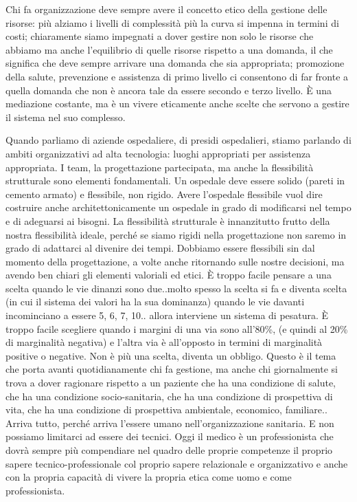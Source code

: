 \documentclass[]{article}
\begin{document}
Chi fa organizzazione deve sempre avere il concetto etico della gestione
delle risorse: più alziamo i livelli di complessità più la curva si
impenna in termini di costi; chiaramente siamo impegnati a dover gestire
non solo le risorse che abbiamo ma anche l'equilibrio di quelle risorse
rispetto a una domanda, il che significa che deve sempre arrivare una
domanda che sia appropriata; promozione della salute, prevenzione e
assistenza di primo livello ci consentono di far fronte a quella domanda
che non è ancora tale da essere secondo e terzo livello. È una
mediazione costante, ma è un vivere eticamente anche scelte che servono
a gestire il sistema nel suo complesso.

Quando parliamo di aziende ospedaliere, di presidi ospedalieri, stiamo
parlando di ambiti organizzativi ad alta tecnologia: luoghi appropriati
per assistenza appropriata. I team, la progettazione partecipata, ma
anche la flessibilità strutturale sono elementi fondamentali. Un
ospedale deve essere solido (pareti in cemento armato) e flessibile, non
rigido. Avere l'ospedale flessibile vuol dire costruire anche
architettonicamente un ospedale in grado di modificarsi nel tempo e di
adeguarsi ai bisogni. La flessibilità strutturale è innanzitutto frutto
della nostra flessibilità ideale, perché se siamo rigidi nella
progettazione non saremo in grado di adattarci al divenire dei tempi.
Dobbiamo essere flessibili sin dal momento della progettazione, a volte
anche ritornando sulle nostre decisioni, ma avendo ben chiari gli
elementi valoriali ed etici. È troppo facile pensare a una scelta quando
le vie dinanzi sono due..molto spesso la scelta si fa e diventa scelta
(in cui il sistema dei valori ha la sua dominanza) quando le vie davanti
incominciano a essere 5, 6, 7, 10.. allora interviene un sistema di
pesatura. È troppo facile scegliere quando i margini di una via sono
all'80\%, (e quindi al 20\% di marginalità negativa) e l'altra via è
all'opposto in termini di marginalità positive o negative. Non è più una
scelta, diventa un obbligo. Questo è il tema che porta avanti
quotidianamente chi fa gestione, ma anche chi giornalmente si trova a
dover ragionare rispetto a un paziente che ha una condizione di salute,
che ha una condizione socio-sanitaria, che ha una condizione di
prospettiva di vita, che ha una condizione di prospettiva ambientale,
economico, familiare.. Arriva tutto, perché arriva l'essere umano
nell'organizzazione sanitaria. E non possiamo limitarci ad essere dei
tecnici. Oggi il medico è un professionista che dovrà sempre più
compendiare nel quadro delle proprie competenze il proprio sapere
tecnico-professionale col proprio sapere relazionale e organizzativo e
anche con la propria capacità di vivere la propria etica come uomo e
come professionista.
\end{document}
